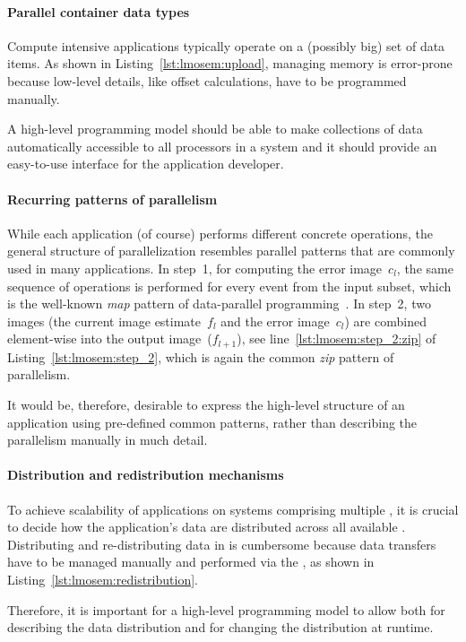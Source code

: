 \paragraph{Parallel container data types}
Compute intensive applications typically operate on a (possibly big) set of data items.
As shown in Listing~\ref{lst:lmosem:upload}, managing memory is error-prone because low-level details, like offset calculations, have to be programmed manually.

A high-level programming model should be able to make collections of data automatically accessible to all processors in a system and it should provide an easy-to-use interface for the application developer.

\paragraph{Recurring patterns of parallelism}
While each application (of course) performs different concrete operations, the general structure of parallelization resembles parallel patterns that are commonly used in many applications.
In step~1, for computing the error image~$c_l$, the same sequence of operations is performed for every event from the input subset, which is the well-known \emph{map} pattern of data-parallel programming~\cite{GorlatchCo2011}.
In step~2, two images (the current image estimate~$f_l$ and the error image~$c_l$) are combined element-wise into the output image~($f_{l+1}$), see line~\ref{lst:lmosem:step_2:zip} of Listing~\ref{lst:lmosem:step_2}, which is again the common \emph{zip} pattern of parallelism.

It would be, therefore, desirable to express the high-level structure of an application using pre-defined common patterns, rather than describing the parallelism manually in much detail.

\paragraph{Distribution and redistribution mechanisms}
To achieve scalability of applications on systems comprising multiple \GPUs, it is crucial to decide how the application's data are distributed across all available \GPUs.
Distributing and re-distributing data in \OpenCL is cumbersome because data transfers have to be managed manually and performed via the \CPU, as shown in Listing~\ref{lst:lmosem:redistribution}.

Therefore, it is important for a high-level programming model to allow both for describing the data distribution and for changing the distribution at runtime.
